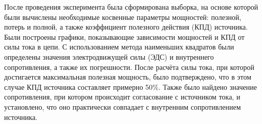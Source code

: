 После проведения эксперимента была сформирована выборка, на основе которой были 
вычислены необходимые косвенные параметры мощностей: полезной, потерь и полной, 
а также коэффициент полезного действия (КПД) источника. Были построены графики, 
показывающие зависимости мощностей и КПД от силы тока в цепи. 
С использованием метода наименьших квадратов были определены значения электродвижущей силы (ЭДС) и внутреннего сопротивления, 
а также их погрешности. После расчёта силы тока, при которой достигается максимальная полезная мощность, 
было подтверждено, что в этом случае КПД источника составляет примерно 50\%. 
Также было найдено значение сопротивления, при котором происходит согласование с источником тока, 
и установлено, что оно практически совпадает с внутренним сопротивлением источника.